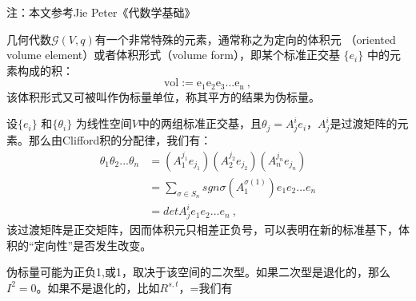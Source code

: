 
注：本文参考Jie Peter《代数学基础》

几何代数$\mathcal G(V,q)$有一个非常特殊的元素，通常称之为定向的体积元
（oriented volume element）或者体积形式（volume form），即某个标准正交基 $\{e_i\}$ 中的元素构成的积：
$$\mathrm {vol:=e_1e_2e_3...e_n}~,$$
该体积形式又可被叫作伪标量单位，称其平方的结果为伪标量。

设$\{e_i\}$ 和$\{\theta_i\}$ 为线性空间$V$中的两组标准正交基，且$\theta_j=A^i_j e_i$，$A^i_j$是过渡矩阵的元素。那么由Clifford积的分配律，我们有：
\begin{equation}
\begin{aligned}
\theta_1\theta_2...\theta_n&=(A^{j_1}_1 e_{j_1})(A^{j_2}_2 e_{j_2})(A^{j_n}_n e_{j_n})\\
&=\sum_{\sigma\in S_n} sgn\sigma(A^{\sigma (1)}_1)e_1e_2...e_n\\
&=det A^i_je_1e_2...e_n~,
\end{aligned}
\end{equation}
该过渡矩阵是正交矩阵，因而体积元只相差正负号，可以表明在新的标准基下，体积的“定向性”是否发生改变。

伪标量可能为正负1,或1，取决于该空间的二次型。如果二次型是退化的，那么$I^2=0$。如果不是退化的，比如$R^{s,t}$，=我们有

